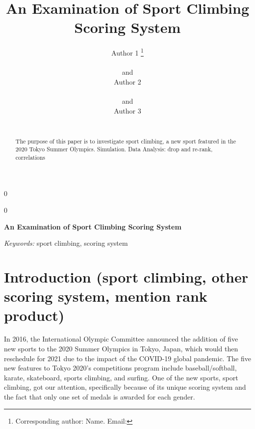 \documentclass[12pt]{article}
\newcommand{\blind}{0}
\begin{document}
\def\spacingset#1{\renewcommand{\baselinestretch}%
{#1}\small\normalsize} \spacingset{1}



\blind
{
  \title{\bf An Examination of Sport Climbing Scoring System}

  \author{
        Author 1 \thanks{Corresponding author: Name. Email:} \\
    \\
     and \\     Author 2 \\
    \\
     and \\     Author 3 \\
    \\
      }
  \maketitle
} \fi

\blind
{
  \bigskip
  \bigskip
  \bigskip
  \begin{center}
    {\LARGE\bf An Examination of Sport Climbing Scoring System}
  \end{center}
  \medskip
} \fi

\bigskip
\begin{abstract}
The purpose of this paper is to investigate sport climbing, a new sport
featured in the 2020 Tokyo Summer Olympics. Simulation. Data Analysis:
drop and re-rank, correlations
\end{abstract}

\noindent%
{\it Keywords:} sport climbing, scoring system
\vfill

\newpage
\spacingset{1.45} %

\normalsize

\hypertarget{introduction-sport-climbing-other-scoring-system-mention-rank-product}{%
\section{Introduction (sport climbing, other scoring system, mention
rank
product)}\label{introduction-sport-climbing-other-scoring-system-mention-rank-product}}

In 2016, the International Olympic Committee announced the addition of
five new sports to the 2020 Summer Olympics in Tokyo, Japan, which would
then reschedule for 2021 due to the impact of the COVID-19 global
pandemic. The five new features to Tokyo 2020's competitions program
include baseball/softball, karate, skateboard, sports climbing, and
surfing. One of the new sports, sport climbing, got our attention,
specifically because of its unique scoring system and the fact that only
one set of medals is awarded for each gender.
\end{document}
